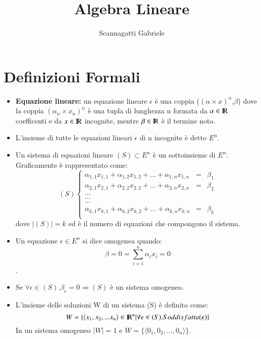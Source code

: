 \documentclass[12pt,a4paper]{article}
\title{Algebra Lineare}
\author{Scannagatti Gabriele}
\theoremstyle{break}
\newcommand\R{{\rm I\!R}}
\begin{document}
    \maketitle
    \newpage
    \section{Definizioni Formali}
    \begin{itemize}
        \item \textbf{Equazione lineare:} un equazione lineare $\epsilon$ è una coppia ($(\alpha\times x)^n$,$\beta$)
        dove la coppia $(\alpha_n\times x_n)^n$ è una tupla di lunghezza n formata da $\alpha\in\R$ coefficenti e da $x\in \R$ incognite, mentre $\beta\in \R $ è il termine noto.
        \item L'insieme di tutte le equazioni lineari $\epsilon$ di n incognite è detto $E^n$.
        \item Un sistema di equazioni lineare $(S)\subset E^n$ è un sottoinsieme di $E^n$. Graficamente è rappresentato come:
            \[(S) 
            \left\{ 
                \begin{array}{lcr} 
                   \alpha_{1,1}x_{1,1} + \alpha_{1,2}x_{1,2} + ... + \alpha_{1,n}x_{1,n} & = & \beta_1 \\ 
                   \alpha_{2,1}x_{2,1} + \alpha_{2,2}x_{2,2} + ... + \alpha_{2,n}x_{2,n} & = & \beta_2 \\ 
                   ... \\
                   ... \\
                   ... \\
                   \alpha_{k,1}x_{k,1} + \alpha_{k,2}x_{k,2} + ... + \alpha_{k,n}x_{k,n} & = & \beta_k \\ 
                \end{array}
                \right. 
            \]
            dove $|(S)| = k$ ed è il numero di equazioni che compongono il sistema.
        \item Un equazione $\epsilon\in E^n$ si dice omogenea quando: 
        \[\beta = 0 = \sum_{i=1}^{n}\alpha_ix_i = 0\].
        \item Se $\forall\epsilon\in(S).\beta_\epsilon = 0\Rightarrow (S)$ è un sistema omogeneo.
        \item L'insieme delle soluzioni W di un sistema (S) è definito come:
        \[W=\{\langle x_1,x_2,...x_n\rangle\in\R^n | \forall\epsilon\in(S).\space Soddisfatta(\epsilon)\}\]
        In un sistema omogeneo $|W| = 1$ e $W = \{\langle 0_1, 0_2,...,0_n \rangle\}$.
    \end{itemize}
    \newpage
\end{document}
